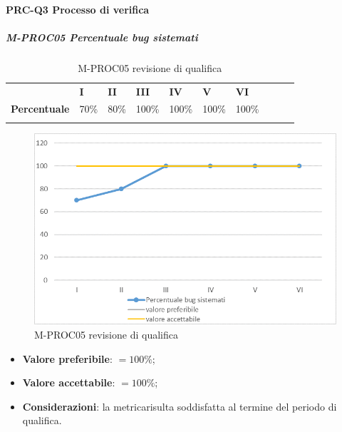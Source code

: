 \paragraph*{PRC-Q3 Processo di verifica}
\subparagraph{M-PROC05 Percentuale bug sistemati} \mbox{}
\begin{longtable}[H!] {						
		>{}p{50mm}  		
		>{}p{8mm}
		>{}p{8mm}		
		>{}p{8mm}		
		>{}p{8mm}		
		>{}p{8mm}		
		>{}p{8mm}
		>{}p{8mm}
		>{}p{8mm}
		>{}p{8mm}
	}
	\rowcolor{gray!50}
	\textbf{} & \textbf{I} & \textbf{II} & \textbf{III} & \textbf{IV} & \textbf{V} & \textbf{VI} \TBstrut \\ [2mm]
	\textbf{Percentuale} & 70\% & 80\% & 100\% & 100\% & 100\% & 100\% \TBstrut \\ [2mm]
	\rowcolor{white}
	\caption{M-PROC05 revisione di qualifica}
\end{longtable}
\begin{figure}[H] 	
	\includegraphics[width=\linewidth]{./img/grafici/RQ5.png}	
	\caption{M-PROC05 revisione di qualifica}	
\end{figure}
\begin{itemize}
	\item \textbf{Valore preferibile}: $=100\%$;
	\item \textbf{Valore accettabile}: $=100\%$;
	\item \textbf{Considerazioni}: la metrica\glosp risulta soddisfatta al termine del periodo di qualifica.
\end{itemize}

